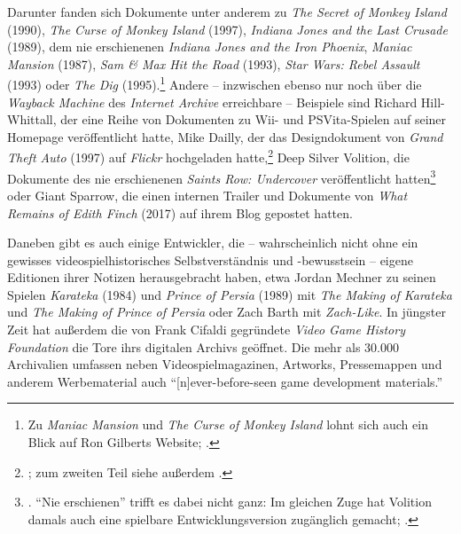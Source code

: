 \documentclass[a5paper,pagesize,numbers=noenddot]{scrbook}
\begin{document}
Darunter fanden sich Dokumente unter anderem zu \textit{The Secret of Monkey Island} (1990), \textit{The Curse of Monkey Island} (1997), \textit{Indiana Jones and the Last Crusade} (1989), dem nie erschienenen \textit{Indiana Jones and the Iron Phoenix}, \textit{Maniac Mansion} (1987), \textit{Sam \& Max Hit the Road} (1993), \textit{Star Wars: Rebel Assault} (1993) oder \textit{The Dig} (1995).\footnote{Zu \textit{Maniac Mansion} und \textit{The Curse of Monkey Island} lohnt sich auch ein Blick auf Ron Gilberts Website; \autocite[vgl. etwa][]{gilbert_maniac_mansion_2014}.}
Andere -- inzwischen ebenso nur noch über die \textit{Wayback Machine} des \textit{Internet Archive} erreichbare -- Beispiele sind Richard Hill-Whittall, der eine Reihe von Dokumenten zu Wii- und PSVita-Spielen auf seiner Homepage veröffentlicht hatte,\autocite[Vgl.][]{hill_whittall_gdd_2017} Mike Dailly, der das Designdokument von \textit{Grand Theft Auto} (1997) auf \textit{Flickr} hochgeladen hatte,\footnote{\autocite[Vgl.][]{dailly_race_n_chase_2011}; zum zweiten Teil siehe außerdem \autocite{internet_archive_gta_2}.} Deep Silver Volition, die Dokumente des nie erschienenen \textit{Saints Row: Undercover} veröffentlicht hatten\footnote{\autocite[Vgl.][]{volition_thursday_2016}. \enquote{Nie erschienen} trifft es dabei nicht ganz: Im gleichen Zuge hat Volition damals auch eine spielbare Entwicklungsversion zugänglich gemacht; \autocite[vgl.][]{frank_canceled_2016}.} oder Giant Sparrow, die einen internen Trailer und Dokumente von \textit{What Remains of Edith Finch} (2017) auf ihrem Blog gepostet hatten.\autocite[Vgl.][]{giant_sparrow_edith_2018}

Daneben gibt es auch einige Entwickler, die -- wahrscheinlich nicht ohne ein gewisses videospielhistorisches Selbstverständnis und -bewusstsein -- eigene Editionen ihrer Notizen herausgebracht haben, etwa Jordan Mechner zu seinen Spielen \textit{Karateka} (1984) und \textit{Prince of Persia} (1989) mit \textit{The Making of Karateka} und \textit{The Making of Prince of Persia} oder Zach Barth mit \textit{Zach-Like}.\autocite[Vgl.][]{mechner_karateka_2012,mechner_prince_2020,barth_zach_like_2019}
In jüngster Zeit hat außerdem die von Frank Cifaldi gegründete \textit{Video Game History Foundation} die Tore ihrs digitalen Archivs geöffnet.
Die mehr als 30.000 Archivalien umfassen neben Videospielmagazinen, Artworks, Pressemappen und anderem Werbematerial auch \enquote{[n]ever-before-seen game development materials.}\autocite{salvador_library_2025}
\end{document}
